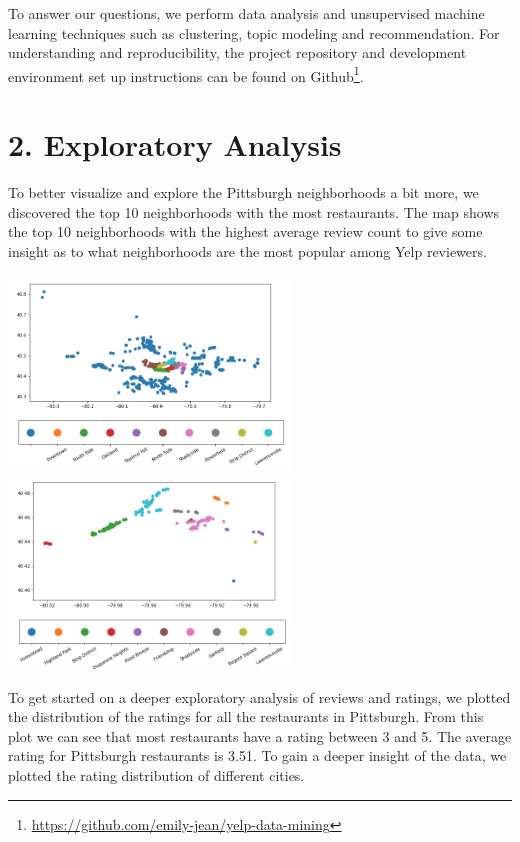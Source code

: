 \documentclass{neu_handout}
\begin{document}
To answer our questions, we perform data analysis and unsupervised machine learning techniques such as clustering, topic modeling and recommendation. For understanding and reproducibility, the project repository and development environment set up instructions can be found on Github\footnote{\url{https://github.com/emily-jean/yelp-data-mining}}. 

\section*{2. Exploratory Analysis}


To better visualize and explore the Pittsburgh neighborhoods a bit more, we discovered the top 10 neighborhoods with the most restaurants. The map shows the top 10 neighborhoods with the highest average review count to give some insight as to what neighborhoods are the most popular among Yelp reviewers.

\begin{center}
\includegraphics[width=75mm,scale=0.5]{pitts_hoods_most_restaurants}
\includegraphics[width=75mm,scale=0.5]{top_10_most_popular_neighborhoods}
\end{center}

To get started on a deeper exploratory analysis of reviews and ratings, we plotted the distribution of the ratings for all the restaurants in Pittsburgh. From this plot we can see that most restaurants have a rating between 3 and 5. The average rating for Pittsburgh restaurants is 3.51. To gain a deeper insight of the data, we plotted the rating distribution of different cities. 
\end{document}
